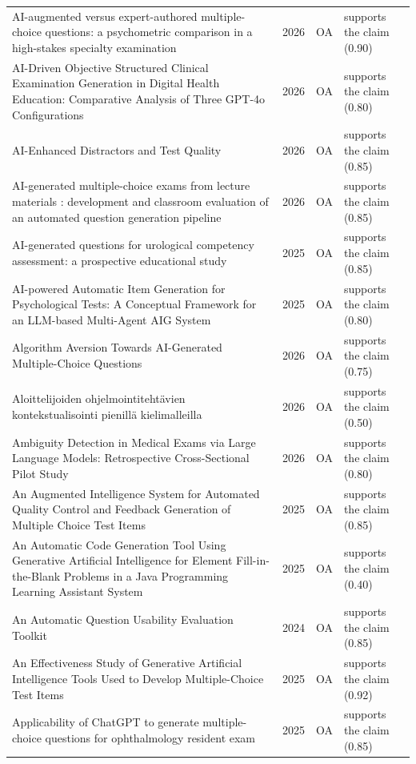 \begin{longtable}{@{}%
  >{\raggedright\arraybackslash}p{}c%
  >{\raggedright\arraybackslash}p{}%
  >{\raggedright\arraybackslash}p{}@{}}
AI-augmented versus expert-authored multiple-choice questions: a psychometric comparison in a high-stakes specialty examination & 2026 & OA & supports the claim (0.90) \\
AI-Driven Objective Structured Clinical Examination Generation in Digital Health Education: Comparative Analysis of Three GPT-4o Configurations & 2026 & OA & supports the claim (0.80) \\
AI-Enhanced Distractors and Test Quality & 2026 & OA & supports the claim (0.85) \\
AI-generated multiple-choice exams from lecture materials : development and classroom evaluation of an automated question generation pipeline & 2026 & OA & supports the claim (0.85) \\
AI-generated questions for urological competency assessment: a prospective educational study & 2025 & OA & supports the claim (0.85) \\
AI-powered Automatic Item Generation for Psychological Tests: A Conceptual Framework for an LLM-based Multi-Agent AIG System & 2025 & OA & supports the claim (0.80) \\
Algorithm Aversion Towards AI-Generated Multiple-Choice Questions & 2026 & OA & supports the claim (0.75) \\
Aloittelijoiden ohjelmointitehtävien kontekstualisointi pienillä kielimalleilla & 2026 & OA & supports the claim (0.50) \\
Ambiguity Detection in Medical Exams via Large Language Models: Retrospective Cross-Sectional Pilot Study & 2026 & OA & supports the claim (0.80) \\
An Augmented Intelligence System for Automated Quality Control and Feedback Generation of Multiple Choice Test Items & 2025 & OA & supports the claim (0.85) \\
An Automatic Code Generation Tool Using Generative Artificial Intelligence for Element Fill-in-the-Blank Problems in a Java Programming Learning Assistant System & 2025 & OA & supports the claim (0.40) \\
An Automatic Question Usability Evaluation Toolkit & 2024 & OA & supports the claim (0.85) \\
An Effectiveness Study of Generative Artificial Intelligence Tools Used to Develop Multiple-Choice Test Items & 2025 & OA & supports the claim (0.92) \\
Applicability of ChatGPT to generate multiple-choice questions for ophthalmology resident exam & 2025 & OA & supports the claim (0.85) \\

\end{longtable}
